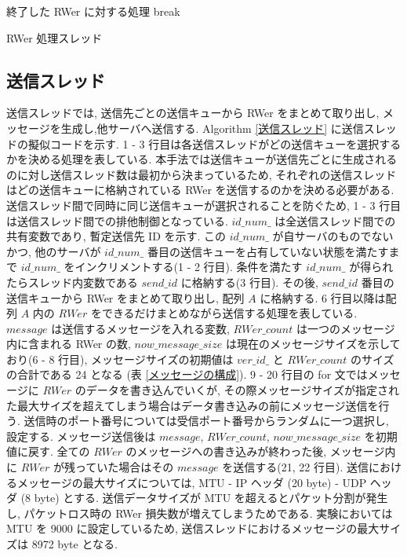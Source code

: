 \begin{algorithm}[p]
{{{{{{\nl                         終了した RWer に対する処理\;
\nl                         break\;}
\nl                     {}}}}}}
\caption{{RWer 処理スレッド} \label{RWer 処理スレッド}}
\end{algorithm}

\subsection{送信スレッド}\label{sub:送信スレッド}

送信スレッドでは, 送信先ごとの送信キューから RWer をまとめて取り出し, メッセージを生成し,他サーバへ送信する. Algorithm \ref{送信スレッド} に送信スレッドの擬似コードを示す. 1 - 3 行目は各送信スレッドがどの送信キューを選択するかを決める処理を表している. 本手法では送信キューが送信先ごとに生成されるのに対し送信スレッド数は最初から決まっているため, それぞれの送信スレッドはどの送信キューに格納されている RWer を送信するのかを決める必要がある. 送信スレッド間で同時に同じ送信キューが選択されることを防ぐため, 1 - 3 行目は送信スレッド間での排他制御となっている. $id\_num\_$ は全送信スレッド間での共有変数であり, 暫定送信先 ID を示す. この $id\_num\_$ が自サーバのものでないかつ, 他のサーバが $id\_num\_$ 番目の送信キューを占有していない状態を満たすまで $id\_num\_$ をインクリメントする(1 - 2 行目). 条件を満たす $id\_num\_$ が得られたらスレッド内変数である $send\_id$ に格納する(3 行目). その後, $send\_id$ 番目の送信キューから RWer をまとめて取り出し, 配列 $A$ に格納する. 6 行目以降は配列 $A$ 内の $RWer$ をできるだけまとめながら送信する処理を表している. $message$ は送信するメッセージを入れる変数, $RWer\_count$ は一つのメッセージ内に含まれる RWer の数, $now\_message\_size$ は現在のメッセージサイズを示しており(6 - 8 行目), メッセージサイズの初期値は $ver\_id\_$ と $RWer\_count$ のサイズの合計である 24 となる (表 \ref{メッセージの構成}). 9 - 20 行目の for 文ではメッセージに $RWer$ のデータを書き込んでいくが, その際メッセージサイズが指定された最大サイズを超えてしまう場合はデータ書き込みの前にメッセージ送信を行う. 送信時のポート番号については受信ポート番号からランダムに一つ選択し, 設定する. メッセージ送信後は $message$, $RWer\_count$, $now\_message\_size$ を初期値に戻す. 全ての $RWer$ のメッセージへの書き込みが終わった後, メッセージ内に $RWer$ が残っていた場合はその $message$ を送信する(21, 22 行目). 送信におけるメッセージの最大サイズについては, MTU - IP ヘッダ (20 byte) - UDP ヘッダ (8 byte) とする. 送信データサイズが MTU を超えるとパケット分割が発生し, パケットロス時の RWer 損失数が増えてしまうためである. 実験においては MTU を 9000 に設定しているため, 送信スレッドにおけるメッセージの最大サイズは 8972 byte となる. 

